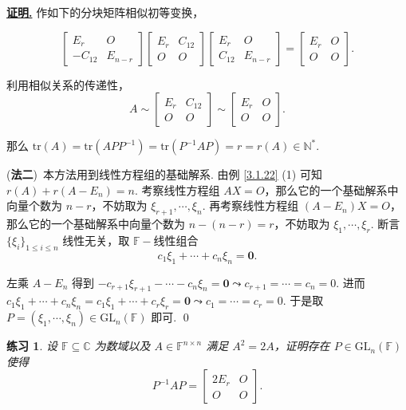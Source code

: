 \documentclass[10pt,openany]{article}
\theoremstyle{thmstyle} %
\newtheorem{practice}{练习}[section]
\theoremstyle{defstyle} %
\theoremstyle{prostyle} %
\theoremstyle{exastyle}
\theoremstyle{remstyle}
\renewenvironment{proof}[1][证明]{\par\underline{\textbf{#1.}} \;\fangsong}{\qed\par}
\newcommand{\F}{\mathbb{F}}
\newcommand{\gfn}{\text{GL}_n(\mathbb{F})}
\newcommand{\C}{\mathbb{C}}
\newcommand{\n}{^{n \times n}}
\newcommand{\tr}{\mathrm{tr}}
\begin{document}
\begin{proof}
     作如下的分块矩阵相似初等变换，
   
     \[ \begin{bmatrix}
     	E_r & O \\
     	-C_{12} & E_{n-r}
     \end{bmatrix}\begin{bmatrix}
     E_r & C_{12} \\
     O & O
     \end{bmatrix}\begin{bmatrix}
     E_r & O \\
     C_{12} & E_{n-r}
     \end{bmatrix}=\begin{bmatrix}
     E_r & O \\
     O & O
     \end{bmatrix}. \]
     
     利用相似关系的传递性，
     \[ A \sim \begin{bmatrix}
     	E_r & C_{12} \\
     	O & O
     \end{bmatrix} \sim \begin{bmatrix}
     E_r & O \\
     O & O
     \end{bmatrix}. \]
    
    那么 \( \tr(A)=\tr(APP^{-1})=\tr(P^{-1}AP)=r=r(A) \in \mathbb{N}^* \).
    
    (\textbf{法二})\ 本方法用到线性方程组的基础解系. 由例 \ref{3.1.22} (1) 可知 \( r(A)+r(A-E_n)=n \). 考察线性方程组 \( AX=O \)，那么它的一个基础解系中向量个数为 \( n-r \)，不妨取为 \( \xi_{r+1},\cdots,\xi_{n} \). 再考察线性方程组 \( (A-E_n)X=O \)，那么它的一个基础解系中向量个数为 \( n-(n-r)=r \)，不妨取为 \(\xi_1,\cdots,\xi_r \). 断言 \( \{\xi_i\}_{1 \leq i \leq n} \) 线性无关，取 \( \F-\)线性组合
    \[ c_1\xi_1+\cdots+c_n\xi_n=\bm{0}. \]
    
    左乘 \( A-E_n \) 得到 \( -c_{r+1}\xi_{r+1}-\cdots-c_n\xi_n=\bm{0} \leadsto c_{r+1}=\cdots=c_n=0 \). 进而 \( c_1\xi_1+\cdots+c_n\xi_n=c_1\xi_1+\cdots+c_r\xi_r=\bm{0} \leadsto c_1=\cdots=c_r=0 \). 于是取 \( P=(\xi_1,\cdots,\xi_n) \in \gfn \) 即可.
\end{proof}


\begin{practice} \label{prac3.16}
    设 \( \F \subseteq \C \) 为数域以及 \( A \in \F\n \) 满足 \( A^2=2A \)，证明存在 \( P \in \gfn \) 使得
     \[ P^{-1}AP=\begin{bmatrix}
	2E_r & O \\
	O & O
    \end{bmatrix}. \]
\end{practice}
\end{document}
